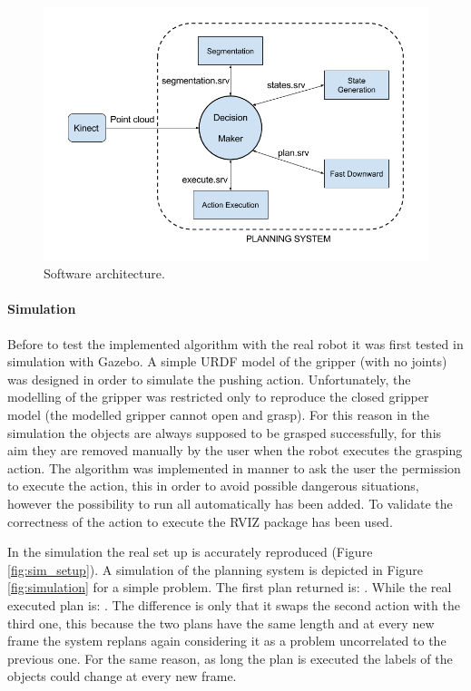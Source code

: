 \begin{figure}[h]
\centering
\includegraphics[width=14cm]{Img/software/Software_arquitecture.png}
\caption{Software architecture.}\label{fig:architecture}
\end{figure}


\paragraph{Simulation}
Before to test the implemented algorithm with the real robot it was first tested in simulation with Gazebo\citep{koenig2004design}. A simple URDF model of the gripper (with no joints) was designed in order to simulate the pushing action. Unfortunately, the modelling of the gripper was restricted only to reproduce the closed gripper model (the modelled gripper cannot open and grasp). For this reason in the simulation the objects are always supposed to be grasped successfully, for this aim they are removed manually by the user when the robot executes the grasping action. The algorithm was implemented in manner to ask the user the permission to execute the action, this in order to avoid possible dangerous situations, however the possibility to run all automatically has been added. To validate the correctness of the action to execute the RVIZ package\citep{RVIZ} has been used.  

In the simulation the real set up is accurately reproduced (Figure \ref{fig:sim_setup}). A simulation of the planning system is depicted in Figure \ref{fig:simulation} for a simple problem.
The first plan returned is: . While the real executed plan is: . The difference is only that it swaps the second action with the third one, this because the two plans have the same length and at every new frame the system replans again considering it as a problem uncorrelated to the previous one. For the same reason, as long the plan is executed the labels of the objects could change at every new frame. %

